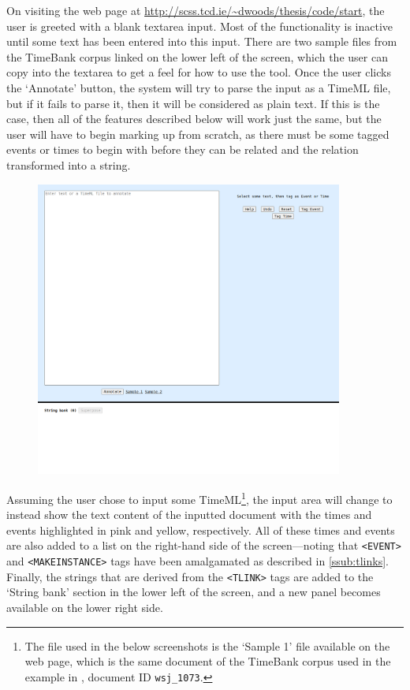 \documentclass[a4paper,12pt,leqno,twoside]{article}
\begin{document}
On visiting the web page at \url{http://scss.tcd.ie/~dwoods/thesis/code/start}, the user is greeted with a blank textarea input. Most of the functionality is inactive until some text has been entered into this input. There are two sample files from the TimeBank corpus \citep{pustejovsky2006timebank} linked on the lower left of the screen, which the user can copy into the textarea to get a feel for how to use the tool. Once the user clicks the `Annotate' button, the system will try to parse the input as a TimeML file, but if it fails to parse it, then it will be considered as plain text. If this is the case, then all of the features described below will work just the same, but the user will have to begin marking up from scratch, as there must be some tagged events or times to begin with before they can be related and the relation transformed into a string.
\begin{center}
	\begin{figure}[h!]
		\centering
		\includegraphics[width=0.9\textwidth]{images/START-blank.png}
	\end{figure}
\end{center}
Assuming the user chose to input some TimeML\footnote{The file used in the below screenshots is the `Sample 1' file available on the web page, which is the same document of the TimeBank corpus used in the example in , document ID \texttt{wsj\_1073}.}, the input area will change to instead show the text content of the inputted document with the times and events highlighted in pink and yellow, respectively. All of these times and events are also added to a list on the right-hand side of the screen---noting that \verb|<EVENT>| and \verb|<MAKEINSTANCE>| tags have been amalgamated as described in \cref{ssub:tlinks}. Finally, the strings that are derived from the \verb|<TLINK>| tags are added to the `String bank' section in the lower left of the screen, and a new panel becomes available on the lower right side.
\end{document}

